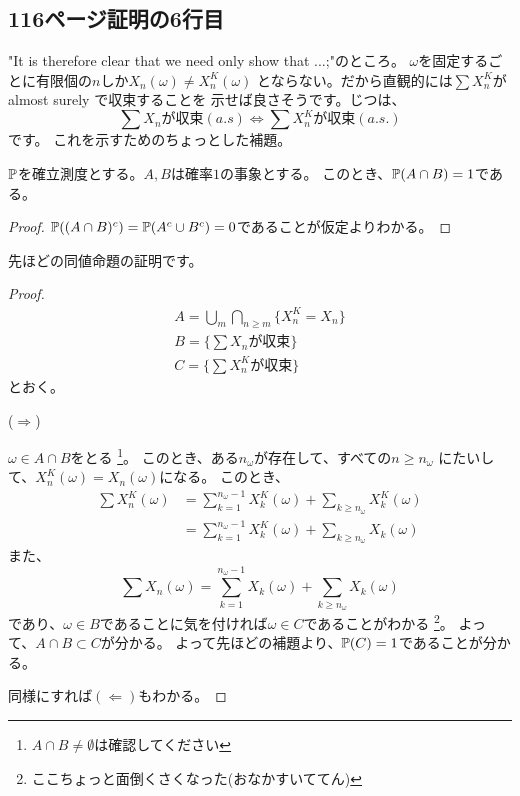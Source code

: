   \subsection{116ページ証明の6行目}
    "It is therefore clear that we need only show that ...;"のところ。
    $\omega$を固定するごとに有限個の$n$しか$X_n(\omega) \neq X_n^K(\omega)$
    とならない。だから直観的には$\sum X_n^K$がalmost surely で収束することを
    示せば良さそうです。じつは、
    \[
      \sum X_n \text{が収束}(a.s) \Leftrightarrow \sum X_n^K \text{が収束}(a.s.)
    \]
    です。
    これを示すためのちょっとした補題。
    \begin{lem*}
      ${\mathbb{P}}$を確立測度とする。$A,B$は確率$1$の事象とする。
      このとき、${\mathbb{P}}(A \cap B) = 1$である。
    \end{lem*}
    \begin{proof}
      ${\mathbb{P}}((A \cap B)^c) = {\mathbb{P}}(A^c \cup B^c) = 0$であることが仮定よりわかる。
    \end{proof}
    先ほどの同値命題の証明です。
    \begin{proof}
      \begin{gather*}
        A = \bigcup_m \bigcap_{n \ge m}\{X_n^K = X_n\} \\
        B = \{\sum X_n \text{が収束}\} \\
        C =\{\sum X_n^K \text{が収束}\}
      \end{gather*}
      とおく。

      ($\Rightarrow$)

      $\omega \in A \cap B$をとる
      \footnote{$A \cap B \neq \emptyset$は確認してください}。
      このとき、ある$n_{\omega}$が存在して、すべての$n \ge n_{\omega}$
      にたいして、$X_n^K(\omega) = X_n (\omega)$になる。
      このとき、
      \begin{align*}
        \sum X_n^K(\omega) &= \sum_{k=1}^{n_{\omega}-1} X_k^K(\omega) + \sum_{k\ge n_{\omega}} X_k^K(\omega) \\
        &=\sum_{k=1}^{n_{\omega}-1} X_k^K(\omega) + \sum_{k\ge n_{\omega}} X_k(\omega)
      \end{align*}
      また、
      \[
        \sum X_n(\omega) = \sum_{k=1}^{n_{\omega}-1} X_k(\omega) + \sum_{k\ge n_{\omega}} X_k(\omega)
      \]
      であり、$\omega \in B$であることに気を付ければ$\omega \in C$であることがわかる
      \footnote{ここちょっと面倒くさくなった(おなかすいててん)}。
      よって、$A \cap B \subset C$が分かる。
      よって先ほどの補題より、${\mathbb{P}}(C) = 1$であることが分かる。

      同様にすれば$(\Leftarrow)$もわかる。
    \end{proof}

